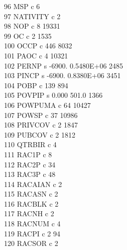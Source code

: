 \documentclass[12pt]{article}
\begin{document}
      96  MSP        c                                  6\\
      97  NATIVITY   c                                  2\\
      98  NOP        c                                  8     19331\\
      99  OC         c                                  2      1535\\
     100  OCCP       c                                446      8032\\
     101  PAOC       c                                  4     10321\\
     102  PERNP      s   -6900.       0.5480E+06               2485\\
     103  PINCP      s   -6900.       0.8380E+06               3451\\
     104  POBP       c                                139       894\\
     105  POVPIP     s    0.000        501.0                   1366\\
     106  POWPUMA    c                                 64     10427\\
     107  POWSP      c                                 37     10986\\
     108  PRIVCOV    c                                  2      1847\\
     109  PUBCOV     c                                  2      1812\\
     110  QTRBIR     c                                  4\\
     111  RAC1P      c                                  8\\
     112  RAC2P      c                                 34\\
     113  RAC3P      c                                 48\\
     114  RACAIAN    c                                  2\\
     115  RACASN     c                                  2\\
     116  RACBLK     c                                  2\\
     117  RACNH      c                                  2\\
     118  RACNUM     c                                  4\\
     119  RACPI      c                                  2        94\\
     120  RACSOR     c                                  2\\
\end{document}
